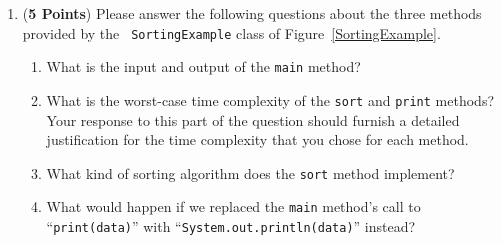 \documentclass[12pt]{article}
\begin{document}
\begin{enumerate}
\begin{enumerate}


\item ({\bf 5 Points}) Please answer the following questions about the three methods provided by the {\tt
SortingExample} class of Figure~\ref{SortingExample}.

  \begin{enumerate}

  \item What is the input and output of the {\tt main} method?

  \item What is the worst-case time complexity of the {\tt sort} and
    {\tt print} methods?  Your response to this part of the question
    should furnish a detailed justification for the time complexity
    that you chose for each method.

  \item What kind of sorting algorithm does the {\tt sort} method
    implement?

    \item \begin{sloppypar}
      What would happen if we replaced the {\tt main} method's call to ``{\tt print(data)}'' with
      ``{\tt System.out.println(data)}'' instead?
    \end{sloppypar} 

  \end{enumerate}



\end{enumerate}
\end{enumerate}
\end{document}
